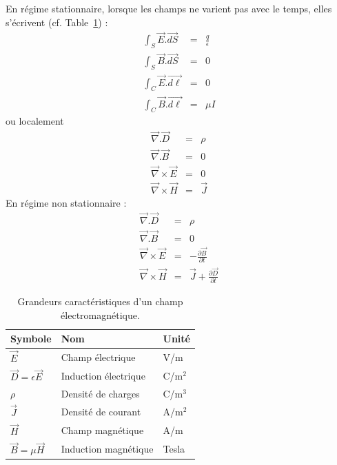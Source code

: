 En régime stationnaire, lorsque les champs ne varient pas avec le temps, elles s'écrivent (cf. Table~\ref{tab:grandeurs_EM}) : 
$$
\begin{array}{rcl}
\int_S \overrightarrow{E}. \overrightarrow{dS}& =&  \frac{q}{\epsilon}\\
\int_S \overrightarrow{B}. \overrightarrow{dS}& =&  0\\
\int_C \overrightarrow{E}. \overrightarrow{d\ell} & = & 0\\
\int_C \overrightarrow{B}. \overrightarrow{d\ell} & = & \mu I
\end{array}$$
ou localement 
$$
\begin{array}{rcl}
\vec{\nabla} . \overrightarrow{D} & = & \rho \\ 
\vec{\nabla} . \overrightarrow{B} &= & 0 \\ 
\vec{\nabla} \times \overrightarrow{E} & = & 0 \\
\vec{\nabla} \times \overrightarrow{H} & = & 
\overrightarrow{J} 
\end{array}$$
En régime non stationnaire :
\begin{eqnarray*}
	\vec{\nabla} . \overrightarrow{D} & = & \rho\\ 
	\vec{\nabla} . \overrightarrow{B} &= & 0 \\ 
	\vec{\nabla} \times \overrightarrow{E} & = & - \frac{\partial
		\overrightarrow{B}}{\partial t}\\
	\vec{\nabla} \times \overrightarrow{H} & = & 
	\overrightarrow{J} + \frac{\partial \overrightarrow{D}}{\partial t}
\end{eqnarray*}



\begin{table}[h]
	\centering
	\caption{Grandeurs caractéristiques d'un champ électromagnétique.} \label{tab:grandeurs_EM}
	\begin{tabular}{lll}
		\toprule
		Symbole & Nom & Unité\\
		\midrule
		$\overrightarrow{E}$ & Champ  électrique & V/m\\
		$\overrightarrow{D}=\epsilon \overrightarrow{E}$ & Induction électrique & C/m$^2$\\
		$\rho$ & Densité de charges & C/m$^3$\\
		$ \overrightarrow{J}$ & Densité de courant & A/m$^2$\\
		$\overrightarrow{H}$ & Champ magnétique & A/m\\
		$\overrightarrow{B}=\mu \overrightarrow{H}$ & Induction magnétique & Tesla\\
		\bottomrule
	\end{tabular}
\end{table}

